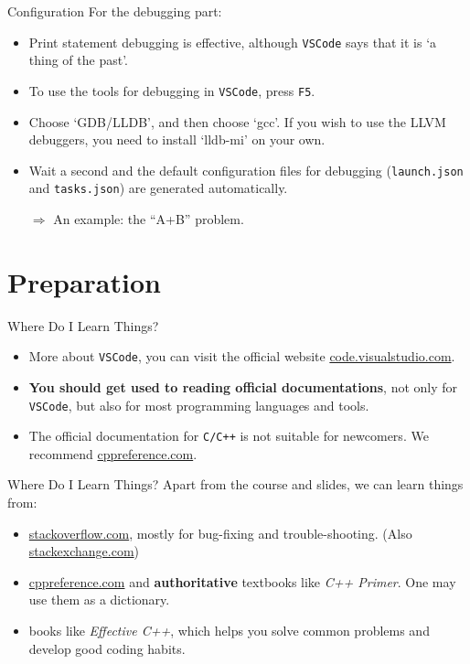 \documentclass[handout]{beamer}
\begin{document}
\begin{frame}{Configuration}
    For the debugging part:
    \begin{itemize}
        \item Print statement debugging is effective, although \texttt{VSCode} says that it is `a thing of the past'.
        \item To use the tools for debugging in \texttt{VSCode}, press \texttt{F5}.
        \item Choose `GDB/LLDB', and then choose `gcc'. If you wish to use the LLVM debuggers, you need to install `lldb-mi' on your own.
        \item Wait a second and the default configuration files for debugging (\texttt{launch.json} and \texttt{tasks.json}) are generated automatically.
        \pause
        \item[\(\Rightarrow\)] An example: the ``A+B'' problem.
    \end{itemize}
\end{frame}

\section{Preparation}

\begin{frame}{Where Do I Learn Things?}
    \begin{itemize}
        \item More about \texttt{VSCode}, you can visit the official website \url{code.visualstudio.com}.
        \item \textbf{You should get used to reading official documentations}, not only for \texttt{VSCode}, but also for most programming languages and tools.
        \pause
        \item The official documentation for \texttt{C/C++} is not suitable for newcomers. We recommend \url{cppreference.com}.
    \end{itemize}
\end{frame}

\begin{frame}{Where Do I Learn Things?}
    Apart from the course and slides, we can learn things from:
    \begin{itemize}
        \item \url{stackoverflow.com}, mostly for bug-fixing and trouble-shooting. (Also \url{stackexchange.com})
        \item \url{cppreference.com} and \textbf{authoritative} textbooks like \textit{C++ Primer}. One may use them as a dictionary.
        \item books like \textit{Effective C++}, which helps you solve common problems and develop good coding habits.
    \end{itemize}
\end{frame}
\end{document}
